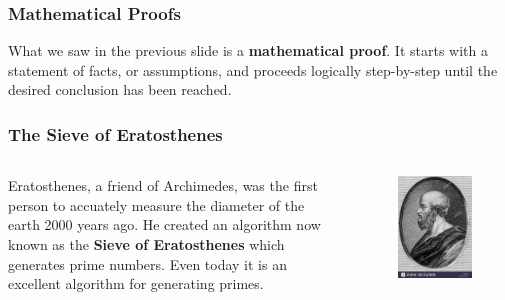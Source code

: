 \documentclass{beamer}
\newcommand{\<}{\langle}
\renewcommand{\>}{\rangle}
\begin{document}
\begin{frame}
\frametitle{Mathematical Proofs}

What we saw in the previous slide is a \textbf{mathematical proof}. It starts with a statement of facts, or assumptions, and proceeds logically step-by-step until the desired conclusion has been reached.
\end{frame}

\begin{frame}
\frametitle{The Sieve of Eratosthenes}

\begin{columns}
\begin{column}{0.5\textwidth}
Eratosthenes, a friend of Archimedes, was the first person to accuately measure the diameter of the earth 2000 years ago. He created an algorithm now known as the \textbf{Sieve of Eratosthenes} which generates prime numbers. Even today it is an excellent algorithm for generating primes. 
\end{column}
\begin{column}{0.5\textwidth}
\begin{figure}
\includegraphics[scale=.1]{IMG/eratosthanes.jpg}
\end{figure}
\end{column}
\end{columns}
\end{frame}
\end{document}
